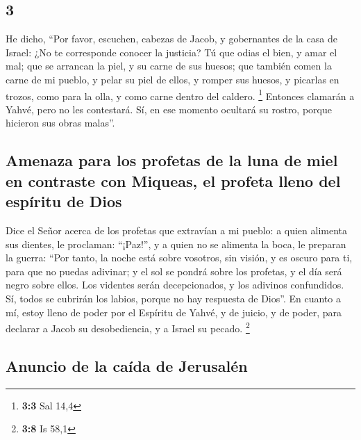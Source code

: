 \begin{paracol}{2}
\hypertarget{section-4}{%
\section{3}\label{section-4}}

 He dicho, ``Por favor, escuchen, cabezas de Jacob, y
gobernantes de la casa de Israel: ¿No te corresponde conocer la
justicia?  Tú que odias el bien, y amar el mal; que se
arrancan la piel, y su carne de sus huesos;  que también
comen la carne de mi pueblo, y pelar su piel de ellos, y romper sus
huesos, y picarlas en trozos, como para la olla, y como carne dentro del
caldero. \footnote{\textbf{3:3} Sal 14,4}  Entonces
clamarán a Yahvé, pero no les contestará. Sí, en ese momento ocultará su
rostro, porque hicieron sus obras malas''.

\hypertarget{amenaza-para-los-profetas-de-la-luna-de-miel-en-contraste-con-miqueas-el-profeta-lleno-del-espuxedritu-de-dios}{%
\subsection{Amenaza para los profetas de la luna de miel en contraste
con Miqueas, el profeta lleno del espíritu de
Dios}\label{amenaza-para-los-profetas-de-la-luna-de-miel-en-contraste-con-miqueas-el-profeta-lleno-del-espuxedritu-de-dios}}

 Dice el Señor acerca de los profetas que extravían a mi
pueblo: a quien alimenta sus dientes, le proclaman: ``¡Paz!'', y a quien
no se alimenta la boca, le preparan la guerra:  ``Por
tanto, la noche está sobre vosotros, sin visión, y es oscuro para ti,
para que no puedas adivinar; y el sol se pondrá sobre los profetas, y el
día será negro sobre ellos.  Los videntes serán
decepcionados, y los adivinos confundidos. Sí, todos se cubrirán los
labios, porque no hay respuesta de Dios''.  En cuanto a
mí, estoy lleno de poder por el Espíritu de Yahvé, y de juicio, y de
poder, para declarar a Jacob su desobediencia, y a Israel su pecado.
\footnote{\textbf{3:8} Is 58,1}

\hypertarget{anuncio-de-la-cauxedda-de-jerusaluxe9n}{%
\subsection{Anuncio de la caída de
Jerusalén}\label{anuncio-de-la-cauxedda-de-jerusaluxe9n}}


\end{paracol}
